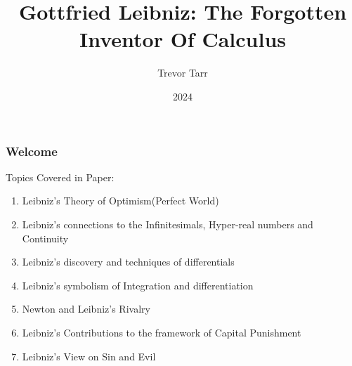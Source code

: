\documentclass{beamer}
\title{Gottfried Leibniz: The Forgotten Inventor Of Calculus }
\author{Trevor Tarr}
\institute{Salem State University}
\date{2024}
\begin{document}
\frame{\titlepage}
\begin{frame}
    \frametitle{Welcome}
    Topics Covered in Paper:
    \begin{enumerate}
        \item Leibniz's Theory of Optimism(Perfect World)
        \item Leibniz's connections to the Infinitesimals, Hyper-real numbers and Continuity
        \item Leibniz's discovery and techniques of differentials
        \item Leibniz's symbolism of Integration and differentiation
        \item Newton and Leibniz's Rivalry
        \item Leibniz's Contributions to the framework of Capital Punishment
        \item Leibniz's View on Sin and Evil
    \end{enumerate}
\end{frame}
\end{document}
